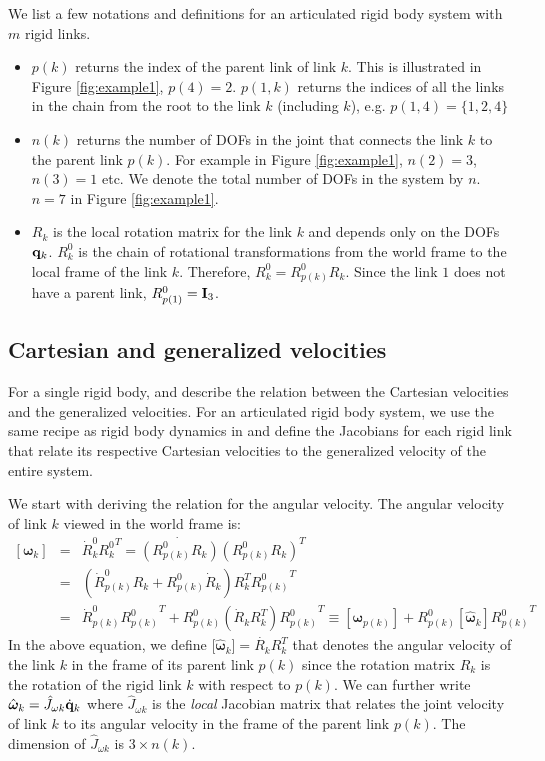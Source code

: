 We list a few notations and definitions for an articulated rigid body system with $m$ rigid links. 
\begin{itemize}
\item $p(k)$ returns the index of the parent link of link $k$. This is illustrated in Figure \ref{fig:example1}, $p(4) = 2$. $p(1,k)$ returns the indices of all the links in the chain from the root to the link $k$ (including $k$), e.g. $p(1,4) = \{1,2,4\}$
\item $n(k)$ returns the number of DOFs in the joint that connects the link $k$ to the parent link $p(k)$. For example in Figure \ref{fig:example1}, $n(2) = 3$, $n(3) = 1$ etc. We denote the total number of DOFs in the system by $n$. \eg $n=7$ in Figure \ref{fig:example1}.
\item $R_k$ is the local rotation matrix for the link $k$ and depends only on the DOFs $\mathbf{q}_k$. $R^0_k$ is the chain of rotational transformations from the
  world frame to the local frame of the link $k$. Therefore, $R^0_k = R^0_{p(k)}R_k$. Since the link $1$ does not have a parent link, $R^0_{p(1)} = \mathbf{I}_3$.
\end{itemize}



\subsection{Cartesian and generalized velocities}

For a single rigid body,  and  describe the relation between the Cartesian velocities and the generalized velocities. 
For an articulated rigid body system, we use the same recipe as rigid body dynamics in  and define the Jacobians for each rigid link that relate its respective Cartesian velocities to the generalized velocity of the entire system. 

We start with deriving the relation for the angular velocity. The angular velocity of link $k$ viewed in the world frame is:
\begin{eqnarray}
\nonumber
[\bm{\omega}_k] & = & \dot{R}^0_k {R^0_k}^T = \dot{(R^0_{p(k)}R_k)} (R^0_{p(k)}R_k)^T\\
\nonumber
& = & (\dot{R}^0_{p(k)}R_k + {R^0_{p(k)}}\dot{R}_k)  R_k^T {R^0_{p(k)}}^T \\
\label{eq:angvelk_recursive}
& = & \dot{R}^0_{p(k)}{R^0_{p(k)}}^T + R^0_{p(k)} \left ( \dot{R}_k R_k^T \right ) {R^0_{p(k)}}^T \equiv [\bm{\omega}_{p(k)}] + R^0_{p(k)} [\hat{\bm{\omega}}_k] {R^0_{p(k)}}^T
\end{eqnarray}
In the above equation, we define [$\hat{\bm{\omega}}_k] = \dot{R_k} R_k^T$ that denotes the angular velocity of the link $k$ in the frame of its parent link $p(k)$ since the rotation matrix $R_k$ is the rotation of the rigid link $k$ with respect to $p(k)$. We can further write $\hat{\bm{\omega}}_k = \hat{J}_{\omega k} \dot{\mathbf{q}}_k$ where $\hat{J}_{\omega k}$ is the \emph{local} Jacobian matrix that relates the joint velocity of link $k$ to its angular velocity in the frame of the parent link $p(k)$. The dimension of $\hat{J}_{\omega k}$ is $3\times n(k)$. 

